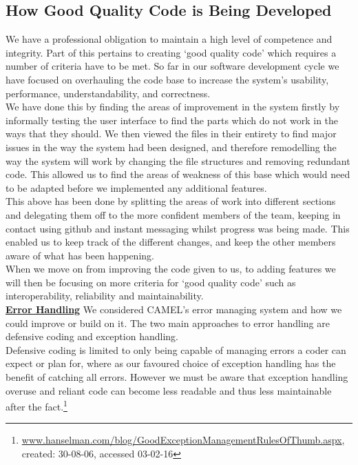 \subsection*{How Good Quality Code is Being Developed}

We have a professional obligation to maintain a high level of competence and integrity. Part of this pertains to creating ‘good quality code’ which requires a number of criteria have to be met. So far in our software development cycle we have focused on overhauling the code base to increase the system's usability, performance, understandability, and correctness.\\

We have done this by finding the areas of improvement in the system firstly by informally testing the user interface to find the parts which do not work in the ways that they should. We then viewed the files in their entirety to find major issues in the way the system had been designed, and therefore remodelling the way the system will work by changing the file structures and removing redundant code. This allowed us to find the areas of weakness of this base which would need to be adapted before we implemented any additional features.\\

This above has been done by splitting the areas of work into different sections and delegating them off to the more confident members of the team, keeping in contact using github and instant messaging whilst progress was being made. This enabled us to keep track of the different changes, and keep the other members aware of what has been happening.\\

When we move on from improving the code given to us, to adding features we will then be focusing on more criteria for ‘good quality code’ such as interoperability, reliability and maintainability.\\

\underline{\textbf{Error Handling}}
We considered CAMEL’s error managing system and how we could improve or build on it. The two main approaches to error handling are defensive coding  and exception handling.\\

Defensive coding is limited to only being capable of managing errors a coder can expect or plan for, where as our favoured choice of exception handling has the benefit of catching all errors. However we must be aware that exception handling overuse and reliant code can become less readable and thus less maintainable after the fact.\footnote{\url{ www.hanselman.com/blog/GoodExceptionManagementRulesOfThumb.aspx}, created: 30-08-06, accessed 03-02-16}\\

